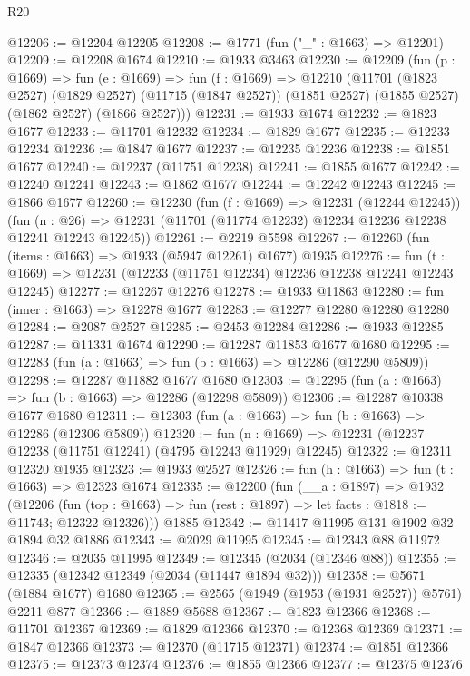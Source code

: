 \begin{lexlean}{R20}
\begin{coremodule}
@12206 := @12204 @12205
@12208 := @1771 (fun ("_" : @1663) => @12201)
@12209 := @12208 @1674
@12210 := @1933 @3463
@12230 := @12209
    (fun (p : @1669) =>
    fun (e : @1669) =>
    fun (f : @1669) =>
    @12210
      (@11701
        (@1823 @2527)
        (@1829 @2527)
        (@11715 (@1847 @2527))
        (@1851 @2527)
        (@1855 @2527)
        (@1862 @2527)
        (@1866 @2527)))
@12231 := @1933 @1674
@12232 := @1823 @1677
@12233 := @11701 @12232
@12234 := @1829 @1677
@12235 := @12233 @12234
@12236 := @1847 @1677
@12237 := @12235 @12236
@12238 := @1851 @1677
@12240 := @12237 (@11751 @12238)
@12241 := @1855 @1677
@12242 := @12240 @12241
@12243 := @1862 @1677
@12244 := @12242 @12243
@12245 := @1866 @1677
@12260 := @12230
    (fun (f : @1669) => @12231 (@12244 @12245))
    (fun (n : @26) => @12231 (@11701 (@11774 @12232) @12234 @12236 @12238 @12241 @12243 @12245))
@12261 := @2219 @5598
@12267 := @12260 (fun (items : @1663) => @1933 (@5947 @12261) @1677) @1935
@12276 := fun (t : @1669) => @12231 (@12233 (@11751 @12234) @12236 @12238 @12241 @12243 @12245)
@12277 := @12267 @12276
@12278 := @1933 @11863
@12280 := fun (inner : @1663) => @12278 @1677
@12283 := @12277 @12280 @12280 @12280
@12284 := @2087 @2527
@12285 := @2453 @12284
@12286 := @1933 @12285
@12287 := @11331 @1674
@12290 := @12287 @11853 @1677 @1680
@12295 := @12283 (fun (a : @1663) => fun (b : @1663) => @12286 (@12290 @5809))
@12298 := @12287 @11882 @1677 @1680
@12303 := @12295 (fun (a : @1663) => fun (b : @1663) => @12286 (@12298 @5809))
@12306 := @12287 @10338 @1677 @1680
@12311 := @12303 (fun (a : @1663) => fun (b : @1663) => @12286 (@12306 @5809))
@12320 := fun (n : @1669) => @12231 (@12237 @12238 (@11751 @12241) (@4795 @12243 @11929) @12245)
@12322 := @12311 @12320 @1935
@12323 := @1933 @2527
@12326 := fun (h : @1663) => fun (t : @1663) => @12323 @1674
@12335 := @12200
    (fun (__a : @1897) =>
    @1932
      (@12206
        (fun (top : @1663) => fun (rest : @1897) => let facts : @1818 := @11743; @12322 @12326)))
    @1885
@12342 := @11417 @11995 @131 @1902 @32 @1894 @32 @1886
@12343 := @2029 @11995
@12345 := @12343 @88 @11972
@12346 := @2035 @11995
@12349 := @12345 (@2034 (@12346 @88))
@12355 := @12335 (@12342 @12349 (@2034 (@11447 @1894 @32)))
@12358 := @5671 (@1884 @1677) @1680
@12365 := @2565 (@1949 (@1953 (@1931 @2527)) @5761) @2211 @877
@12366 := @1889 @5688
@12367 := @1823 @12366
@12368 := @11701 @12367
@12369 := @1829 @12366
@12370 := @12368 @12369
@12371 := @1847 @12366
@12373 := @12370 (@11715 @12371)
@12374 := @1851 @12366
@12375 := @12373 @12374
@12376 := @1855 @12366
@12377 := @12375 @12376

\end{coremodule}
\end{lexlean}
